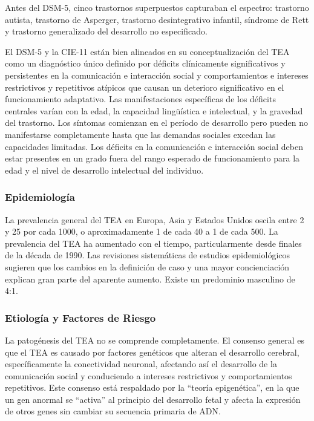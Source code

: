 \documentclass[11pt,letterpaper]{report}
\begin{document}
Antes del DSM-5, cinco trastornos superpuestos capturaban el espectro:
trastorno autista, trastorno de Asperger, trastorno desintegrativo infantil,
síndrome de Rett y trastorno generalizado del desarrollo no especificado.
\cite{Boland2021-by}

El DSM-5 y la CIE-11 están bien alineados en su conceptualización del TEA como
un diagnóstico único definido por déficits clínicamente significativos y
persistentes en la comunicación e interacción social y comportamientos e
intereses restrictivos y repetitivos atípicos que causan un deterioro
significativo en el funcionamiento adaptativo. Las manifestaciones específicas
de los déficits centrales varían con la edad, la capacidad lingüística e
intelectual, y la gravedad del trastorno. Los síntomas comienzan en el período
de desarrollo pero pueden no manifestarse completamente hasta que las demandas
sociales excedan las capacidades limitadas. Los déficits en la comunicación e
interacción social deben estar presentes en un grado fuera del rango esperado
de funcionamiento para la edad y el nivel de desarrollo intelectual del
individuo. \cite{DSM5TR, Myers2025}

\subsubsection{Epidemiología}
La prevalencia general del TEA en Europa, Asia y Estados Unidos oscila entre 2
y 25 por cada 1000, o aproximadamente 1 de cada 40 a 1 de cada 500. La
prevalencia del TEA ha aumentado con el tiempo, particularmente desde finales
de la década de 1990. Las revisiones sistemáticas de estudios epidemiológicos
sugieren que los cambios en la definición de caso y una mayor concienciación
explican gran parte del aparente aumento. Existe un predominio masculino de 4:1.
\cite{AutismUpToDate, Nelson58}

\subsubsection{Etiología y Factores de Riesgo}
La patogénesis del TEA no se comprende completamente. El consenso general es
que el TEA es causado por factores genéticos que alteran el desarrollo
cerebral, específicamente la conectividad neuronal, afectando así el
desarrollo de la comunicación social y conduciendo a intereses restrictivos y
comportamientos repetitivos. Este consenso está respaldado por la ``teoría
epigenética'', en la que un gen anormal se ``activa'' al principio del
desarrollo fetal y afecta la expresión de otros genes sin cambiar su secuencia
primaria de ADN. \cite{AutismUpToDate}
\end{document}
